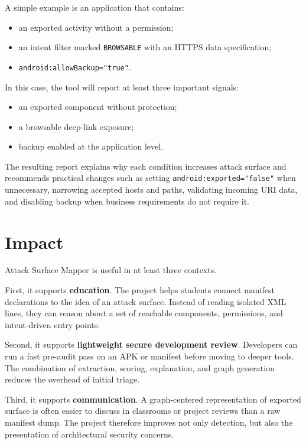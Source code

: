 \documentclass[preprint,12pt,a4paper]{elsarticle}
\begin{document}
A simple example is an application that contains:

\begin{itemize}[leftmargin=*]
\item an exported activity without a permission;
\item an intent filter marked \texttt{BROWSABLE} with an HTTPS data specification;
\item \texttt{android:allowBackup="true"}.
\end{itemize}

In this case, the tool will report at least three important signals:

\begin{itemize}[leftmargin=*]
\item an exported component without protection;
\item a browsable deep-link exposure;
\item backup enabled at the application level.
\end{itemize}

The resulting report explains why each condition increases attack surface and recommends practical changes such as setting \texttt{android:exported="false"} when unnecessary, narrowing accepted hosts and paths, validating incoming URI data, and disabling backup when business requirements do not require it.

\section{Impact}

Attack Surface Mapper is useful in at least three contexts.

First, it supports \textbf{education}. The project helps students connect manifest declarations to the idea of an attack surface. Instead of reading isolated XML lines, they can reason about a set of reachable components, permissions, and intent-driven entry points.

Second, it supports \textbf{lightweight secure development review}. Developers can run a fast pre-audit pass on an APK or manifest before moving to deeper tools. The combination of extraction, scoring, explanation, and graph generation reduces the overhead of initial triage.

Third, it supports \textbf{communication}. A graph-centered representation of exported surface is often easier to discuss in classrooms or project reviews than a raw manifest dump. The project therefore improves not only detection, but also the presentation of architectural security concerns.
\end{document}
